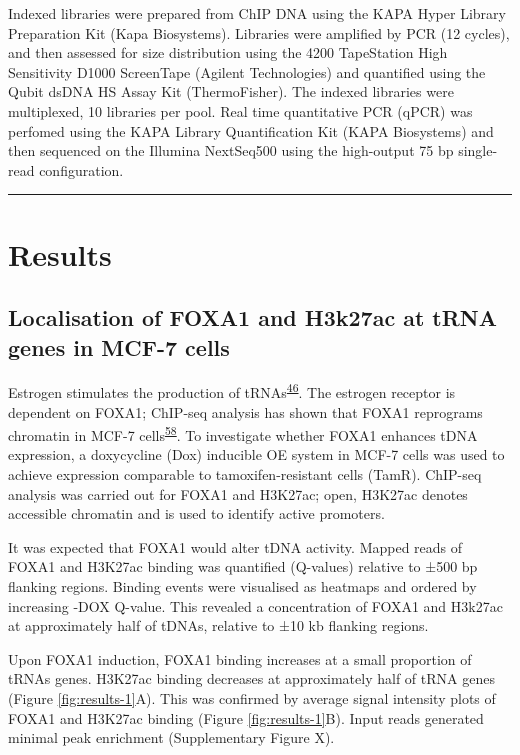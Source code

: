 \documentclass[
  12pt,
]{article}
\begin{document}
Indexed libraries were prepared from ChIP DNA using the KAPA Hyper Library Preparation Kit (Kapa Biosystems).
Libraries were amplified by PCR (12 cycles), and then assessed for size distribution using the 4200 TapeStation High Sensitivity D1000 ScreenTape (Agilent Technologies) and quantified using the Qubit dsDNA HS Assay Kit (ThermoFisher).
The indexed libraries were multiplexed, 10 libraries per pool.
Real time quantitative PCR (qPCR) was perfomed using the KAPA Library Quantification Kit (KAPA Biosystems) and then sequenced on the Illumina NextSeq500 using the high-output 75 bp single-read configuration.

\begin{center}\rule{0.5\linewidth}{0.5pt}\end{center}

\hypertarget{results}{%
\section{Results}\label{results}}

\hypertarget{localisation-of-foxa1-and-h3k27ac-at-trna-genes-in-mcf-7-cells}{%
\subsection{Localisation of FOXA1 and H3k27ac at tRNA genes in MCF-7 cells}\label{localisation-of-foxa1-and-h3k27ac-at-trna-genes-in-mcf-7-cells}}

Estrogen stimulates the production of tRNAs\textsuperscript{\protect\hyperlink{ref-Hah2011}{46}}.
The estrogen receptor is dependent on FOXA1; ChIP-seq analysis has shown that FOXA1 reprograms chromatin in MCF-7 cells\textsuperscript{\protect\hyperlink{ref-fu2016}{58}}.
To investigate whether FOXA1 enhances tDNA expression, a doxycycline (Dox) inducible OE system in MCF-7 cells was used to achieve expression comparable to tamoxifen-resistant cells (TamR).
ChIP-seq analysis was carried out for FOXA1 and H3K27ac; open, H3K27ac denotes accessible chromatin and is used to identify active promoters.

It was expected that FOXA1 would alter tDNA activity.
Mapped reads of FOXA1 and H3K27ac binding was quantified (Q-values) relative to ±500 bp flanking regions.
Binding events were visualised as heatmaps and ordered by increasing -DOX Q-value.
This revealed a concentration of FOXA1 and H3k27ac at approximately half of tDNAs, relative to ±10 kb flanking regions.

Upon FOXA1 induction, FOXA1 binding increases at a small proportion of tRNAs genes.
H3K27ac binding decreases at approximately half of tRNA genes (Figure \ref{fig:results-1}A).
This was confirmed by average signal intensity plots of FOXA1 and H3K27ac binding (Figure \ref{fig:results-1}B).
Input reads generated minimal peak enrichment (Supplementary Figure X).
\end{document}
